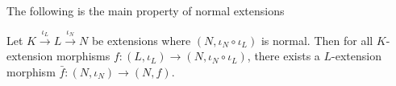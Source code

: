 \documentclass[../book.tex]{subfiles}
\begin{document}
\begin{rmk}
    The following is the main property of normal extensions 
\end{rmk}
\begin{thm}
    
    Let $K \overset{\iota_L}{\to} L \overset{\iota_N}{\to} N$ be extensions
    where $(N,\iota_N\circ\iota_L)$ is normal. 
    Then for all $K$-extension morphisms 
    $f : (L,\iota_L) \to (N,\iota_N\circ\iota_L)$,
    there exists a $L$-extension morphism $\bar{f} : (N,\iota_N) \to (N,f)$.
\end{thm}

    
    
\end{document}

